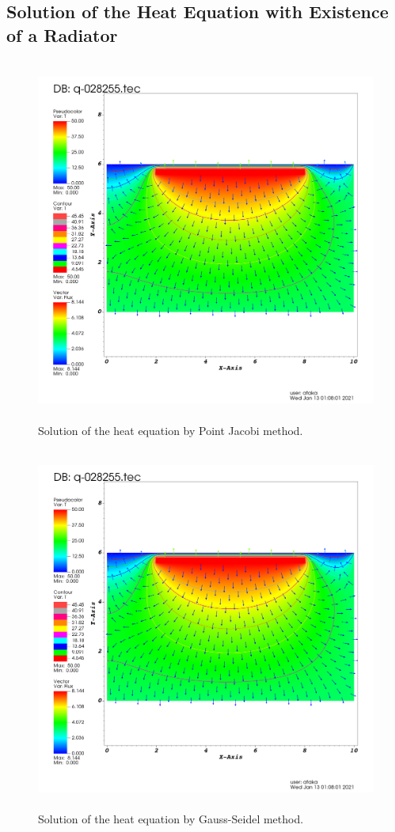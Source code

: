 \documentclass[letterpaper,12pt]{article}
\begin{document}
\subsection{Solution of the Heat Equation with Existence of a Radiator}
\begin{figure}[H] 
	\centering 
	\includegraphics[max height=12cm]{graphs/point_rad_default/point_rad_default.png}
	\caption{Solution of the heat equation by Point Jacobi method.}
 	\label{fig:pointrad}
\end{figure}
\begin{figure}[H] 
	\centering 
	\includegraphics[max height=12cm]{graphs/gauss_rad_default/gauss_rad_default.png}
	\caption{Solution of the heat equation by Gauss-Seidel method.}
 	\label{fig:gaussrad}
\end{figure}
\end{document}

